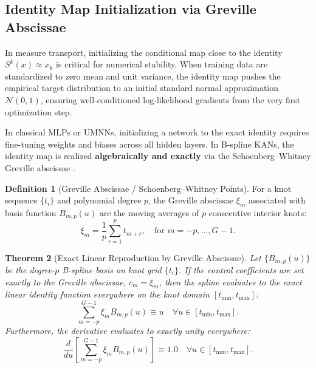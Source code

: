 \documentclass[11pt,a4paper]{article}
\theoremstyle{plain}
\newtheorem{theorem}{Theorem}[section]
\theoremstyle{definition}
\newtheorem{definition}[theorem]{Definition}
\theoremstyle{remark}
\begin{document}
\subsection{Identity Map Initialization via Greville Abscissae}

In measure transport, initializing the conditional map close to the identity $S^k(x) \approx x_k$ is critical for numerical stability. When training data are standardized to zero mean and unit variance, the identity map pushes the empirical target distribution to an initial standard normal approximation $\mathcal{N}(0, 1)$, ensuring well-conditioned log-likelihood gradients from the very first optimization step.

In classical MLPs or UMNNs, initializing a network to the exact identity requires fine-tuning weights and biases across all hidden layers. In B-spline KANs, the identity map is realized \textbf{algebraically and exactly} via the Schoenberg--Whitney Greville abscissae \cite{de1978practical}.

\begin{definition}[Greville Abscissae / Schoenberg--Whitney Points]
For a knot sequence $\{t_i\}$ and polynomial degree $p$, the Greville abscissae $\xi_m$ associated with basis function $B_{m, p}(u)$ are the moving averages of $p$ consecutive interior knots:
\begin{equation}
    \xi_m = \frac{1}{p} \sum_{r=1}^p t_{m+r}, \quad \text{for } m = -p, \dots, G-1.
\end{equation}
\end{definition}

\begin{theorem}[Exact Linear Reproduction by Greville Abscissae]
Let $\{B_{m, p}(u)\}$ be the degree-$p$ B-spline basis on knot grid $\{t_i\}$. If the control coefficients are set exactly to the Greville abscissae, $c_m = \xi_m$, then the spline evaluates to the exact linear identity function everywhere on the knot domain $[t_{\min}, t_{\max}]$:
\begin{equation}
    \sum_{m=-p}^{G-1} \xi_m B_{m, p}(u) \equiv u \quad \forall u \in [t_{\min}, t_{\max}].
    \label{eq:greville_identity}
\end{equation}
Furthermore, the derivative evaluates to exactly unity everywhere:
\begin{equation}
    \frac{d}{du} \left[ \sum_{m=-p}^{G-1} \xi_m B_{m, p}(u) \right] \equiv 1.0 \quad \forall u \in [t_{\min}, t_{\max}].
\end{equation}
\end{theorem}
\end{document}
